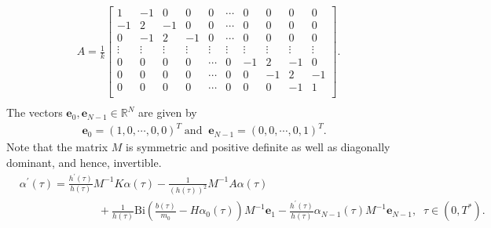 \documentclass{article}
\begin{document}
\begin{align*}
&A = 
\frac{1}{k}\begin{bmatrix}
1 & -1 & 0 & 0 &0&  \cdots&0 &0  & 0&0 \\
-1&2 & -1 & 0 &0& \cdots &0 &0 & 0&0\\
0&-1&2 & -1 & 0 & \cdots &0 &0 &0&0\\
\vdots&\vdots&\vdots &\vdots &  \vdots & \vdots&\vdots&\vdots&\vdots&\vdots\\
0&0&0&0&\cdots&0 & -1 & 2 &-1&0 \\
0&0&0&0&\cdots&0 & 0 & -1 &2&-1 \\
0&0&0&0&\cdots &0& 0 & 0 &-1&1 \\
\end{bmatrix}.\\
\end{align*}
The vectors  $\textbf{e}_0, \textbf{e}_{N-1} \in \mathbb{R}^N$ are given by 
\begin{align*}
\textbf{e}_0 = (1, 0 , \cdots,0, 0)^T\; \text{and} \;\; \textbf{e}_{N-1} = (0, 0 , \cdots, 0, 1)^T.
\end{align*}
Note that the matrix $M$ is symmetric and positive definite as well as  diagonally dominant, and hence, invertible.
\begin{align}
\label{a49}
\nonumber&\alpha^{\prime}(\tau) = \frac{h^{\prime}(\tau)}{h(\tau)} M^{-1}K \alpha(\tau) -  \frac{1}{(h(\tau))^2} M^{-1} A \alpha(\tau)  \\
&\hspace{3cm} +   \frac{1}{h(\tau)}  \text{Bi}\left(\frac{b(\tau)}{m_0}- H\alpha_0(\tau) \right) M^{-1} \textbf{e}_1 - \frac{h^{\prime}(\tau)}{h(\tau)}\alpha_{N-1}(\tau)M^{-1}\textbf{e}_{N-1},\;\; \tau\in(0, T^*).
\end{align}
\end{document}
